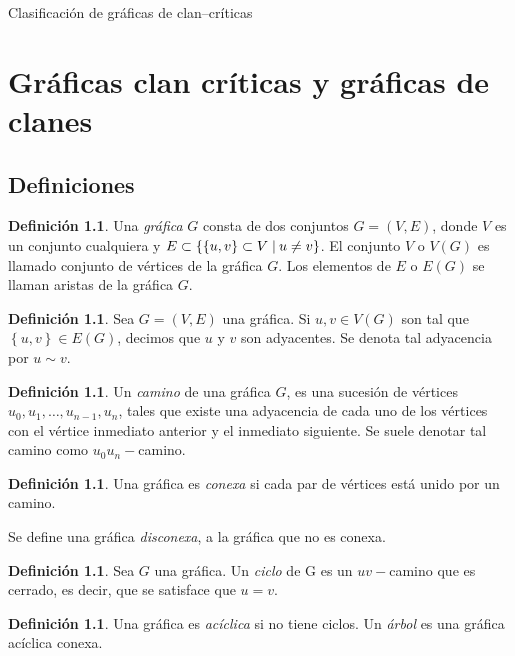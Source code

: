 \documentclass[12pt]{book}
\theoremstyle{definition}
\newtheorem{definition}[theorem]{Definición}
\newcommand{\set}[2]{\{#1\nonscript\;\vert\allowbreak\nonscript\:\mathopen{}#2\}}
\begin{document}
\begin{titlepage}

	\vfill

	{\LARGE Clasificación de gráficas de clan--críticas}\\[2cm]

	\vfill
\end{titlepage}
\chapter{Gráficas clan críticas y gráficas de clanes}
\section{Definiciones}

\begin{definition}
Una \emph{gráfica} $G$ consta de dos conjuntos $G=(V,E)$, donde $V$ es un conjunto cualquiera y $E\subset \set{\left\{u,v\right\}\subset V}{u\neq v}$. El conjunto $V$ o $V(G)$ es llamado conjunto de vértices de la gráfica $G$. Los elementos de $E$ o $E(G)$ se llaman aristas de la gráfica $G$.
\end{definition}

\begin{definition}
Sea $G=(V,E)$ una gráfica. Si $u,v\in V(G)$ son tal que $\left\{u,v\right\}\in E(G)$, decimos que $u$ y $v$ son adyacentes. Se denota tal adyacencia por $u\sim v$.
\end{definition}

\begin{definition}
Un \emph{camino} de una gráfica $G$, es una sucesión de vértices $u_0,u_1,\dots,u_{n-1},u_n$, tales que existe una adyacencia de cada uno de los vértices con el vértice inmediato anterior y el inmediato siguiente. Se suele denotar tal camino como $u_0u_n-$camino.
\end{definition}

\begin{definition}
Una gráfica es \emph{conexa} si cada par de vértices está unido por un camino.
\end{definition}
Se define una gráfica \emph{disconexa}, a la gráfica que no es conexa.

\begin{definition}
Sea $G$ una gráfica. Un \emph{ciclo} de G es un $uv-$camino que es cerrado, es decir, que se satisface que $u=v$.
\end{definition}

\begin{definition}
Una gráfica es \emph{acíclica} si no tiene ciclos. Un \emph{árbol} es una gráfica acíclica conexa. 
\end{definition}
\end{document}
